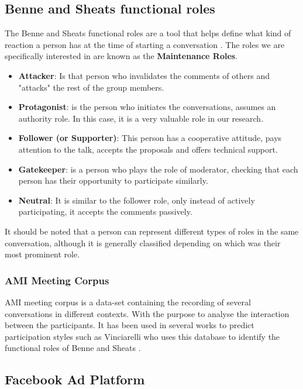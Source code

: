 \subsection{Benne and Sheats functional roles}
\label{section:functional_roles}
The Benne and Sheats functional roles are a tool that helps define what kind of reaction a person has at the time of starting a conversation \cite{benne2007functional}. The roles we are specifically interested in are known as the \textbf{Maintenance Roles}.

\begin{itemize} 
    \item \textbf{Attacker}: Is that person who invalidates the comments of others and "attacks" the rest of the group members.
    \item \textbf{Protagonist}: is the person who initiates the conversations, assumes an authority role. In this case, it is a very valuable role in our research.
    \item \textbf {Follower (or Supporter)}: This person has a cooperative attitude, pays attention to the talk, accepts the proposals and offers technical support.
    \item \textbf{Gatekeeper}: is a person who plays the role of moderator, checking that each person has their opportunity to participate similarly.
    \item \textbf{Neutral}: It is similar to the follower role, only instead of actively participating, it accepts the comments passively.
\end{itemize}

It should be noted that a person can represent different types of roles in the same conversation, although it is generally classified depending on which was their most prominent role.

\subsubsection{AMI Meeting Corpus}

AMI meeting corpus is a data-set containing the recording of several conversations in different contexts. With the purpose to analyse the interaction between the participants. It has been used in several works to predict participation styles such as Vinciarelli \cite{VinciarelliUnderstandingCorpus} who uses this database to identify the functional roles of Benne and Sheats \cite{benne2007functional}.

\subsection{Facebook Ad Platform}
\label{section:facebook_ad_platform}

